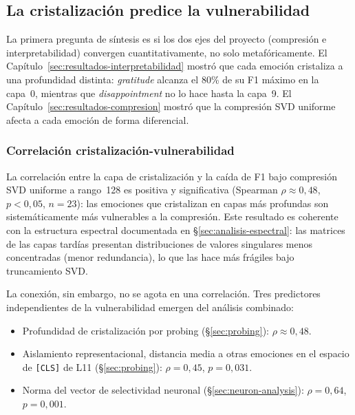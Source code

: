 \subsection{La cristalización predice la vulnerabilidad}
\label{sec:cristalizacion-vulnerabilidad}

La primera pregunta de síntesis es si los dos ejes del proyecto
(compresión e interpretabilidad) convergen cuantitativamente, no
solo metafóricamente. El Capítulo~\ref{sec:resultados-interpretabilidad}
mostró que cada emoción cristaliza a una profundidad distinta:
\emph{gratitude} alcanza el 80\% de su F1 máximo en la capa~0, mientras que
\emph{disappointment} no lo hace hasta la capa~9. El
Capítulo~\ref{sec:resultados-compresion} mostró que la compresión SVD
uniforme afecta a cada emoción de forma diferencial.

\subsubsection{Correlación cristalización-vulnerabilidad}

La correlación entre la capa de cristalización y la caída de F1 bajo
compresión SVD uniforme a rango~128 es positiva y significativa (Spearman
$\rho \approx 0{,}48$, $p < 0{,}05$, $n=23$): las emociones que cristalizan
en capas más profundas son sistemáticamente más vulnerables a la
compresión. Este resultado es coherente con la estructura espectral
documentada en \S\ref{sec:analisis-espectral}: las matrices de las capas
tardías presentan distribuciones de valores singulares menos concentradas
(menor redundancia), lo que las hace más frágiles bajo truncamiento SVD.

La conexión, sin embargo, no se agota en una correlación. Tres predictores
independientes de la vulnerabilidad emergen del análisis combinado:

\begin{itemize}[nosep]
    \item Profundidad de cristalización por probing (\S\ref{sec:probing}):
    $\rho \approx 0{,}48$.
    \item Aislamiento representacional, distancia media a otras emociones
    en el espacio de \texttt{[CLS]} de L11 (\S\ref{sec:probing}):
    $\rho = 0{,}45$, $p = 0{,}031$.
    \item Norma del vector de selectividad neuronal
    (\S\ref{sec:neuron-analysis}): $\rho = 0{,}64$, $p = 0{,}001$.
\end{itemize}

